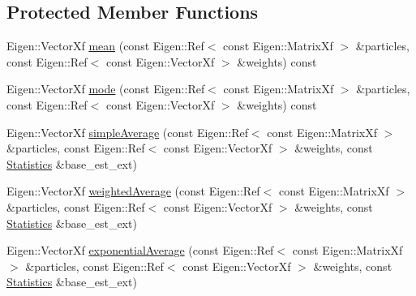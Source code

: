 \subsection*{Protected Member Functions}
\begin{DoxyCompactItemize}
\item 
Eigen\+::\+Vector\+Xf \mbox{\hyperlink{classbfl_1_1EstimatesExtraction_a2398b14fd25bcf319b71a2a4b3472da1}{mean}} (const Eigen\+::\+Ref$<$ const Eigen\+::\+Matrix\+Xf $>$ \&particles, const Eigen\+::\+Ref$<$ const Eigen\+::\+Vector\+Xf $>$ \&weights) const
\item 
Eigen\+::\+Vector\+Xf \mbox{\hyperlink{classbfl_1_1EstimatesExtraction_a6026cb6d03eae12a3af66be4b935878b}{mode}} (const Eigen\+::\+Ref$<$ const Eigen\+::\+Matrix\+Xf $>$ \&particles, const Eigen\+::\+Ref$<$ const Eigen\+::\+Vector\+Xf $>$ \&weights) const
\item 
Eigen\+::\+Vector\+Xf \mbox{\hyperlink{classbfl_1_1EstimatesExtraction_ab35b532eeb7025105a74c2919c15f51f}{simple\+Average}} (const Eigen\+::\+Ref$<$ const Eigen\+::\+Matrix\+Xf $>$ \&particles, const Eigen\+::\+Ref$<$ const Eigen\+::\+Vector\+Xf $>$ \&weights, const \mbox{\hyperlink{classbfl_1_1EstimatesExtraction_a8c0593a43166c569530947107c830462}{Statistics}} \&base\+\_\+est\+\_\+ext)
\item 
Eigen\+::\+Vector\+Xf \mbox{\hyperlink{classbfl_1_1EstimatesExtraction_a9b5c02da5cdeabceae31a1f66e772854}{weighted\+Average}} (const Eigen\+::\+Ref$<$ const Eigen\+::\+Matrix\+Xf $>$ \&particles, const Eigen\+::\+Ref$<$ const Eigen\+::\+Vector\+Xf $>$ \&weights, const \mbox{\hyperlink{classbfl_1_1EstimatesExtraction_a8c0593a43166c569530947107c830462}{Statistics}} \&base\+\_\+est\+\_\+ext)
\item 
Eigen\+::\+Vector\+Xf \mbox{\hyperlink{classbfl_1_1EstimatesExtraction_aef99ef75c04aa871ab9286442f2d7535}{exponential\+Average}} (const Eigen\+::\+Ref$<$ const Eigen\+::\+Matrix\+Xf $>$ \&particles, const Eigen\+::\+Ref$<$ const Eigen\+::\+Vector\+Xf $>$ \&weights, const \mbox{\hyperlink{classbfl_1_1EstimatesExtraction_a8c0593a43166c569530947107c830462}{Statistics}} \&base\+\_\+est\+\_\+ext)
\end{DoxyCompactItemize}
